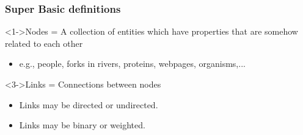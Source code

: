 \begin{frame}
  \frametitle{Super Basic definitions}

  \begin{block}<1->{\alert{Nodes} = A collection of entities 
      which have properties that
      are somehow related to each other}
    \begin{itemize}
    \item <2-> 
      e.g., people, forks in rivers, proteins, webpages, organisms,...
    \end{itemize}
  \end{block}

  \begin{block}<3->{\alert{Links} = Connections between nodes}
    \begin{itemize}
    \item<4->
      \alert{Links} may be directed or undirected.
    \item<5->
      \alert{Links} may be binary or weighted.
    \end{itemize}
  \end{block}


\end{frame}


